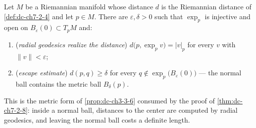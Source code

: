 \begin{lemma}
  \label{lem:dc-ch7-2-8-normal-ball-dist}
  \leanok
  Let $M$ be a Riemannian manifold whose distance $d$ is the Riemannian
  distance of \cref{def:dc-ch7-2-4} and let $p\in M$. There are
  $\varepsilon,\delta>0$ such that $\exp_p$ is injective and open on
  $B_\varepsilon(0)\subset T_pM$ and:
  \begin{enumerate}
  \item (\emph{radial geodesics realize the distance})
    $d\big(p,\exp_p v\big)=|v|_p$ for every $v$ with $\|v\|<\varepsilon$;
  \item (\emph{escape estimate}) $d(p,q)\ge\delta$ for every
    $q\notin\exp_p\big(B_\varepsilon(0)\big)$ — the normal ball contains the
    metric ball $B_\delta(p)$.
  \end{enumerate}
  This is the metric form of \cref{prop:dc-ch3-3-6} consumed by the proof of
  \cref{thm:dc-ch7-2-8}: inside a normal ball, distances to the center are
  computed by radial geodesics, and leaving the normal ball costs a definite
  length.
\end{lemma}
